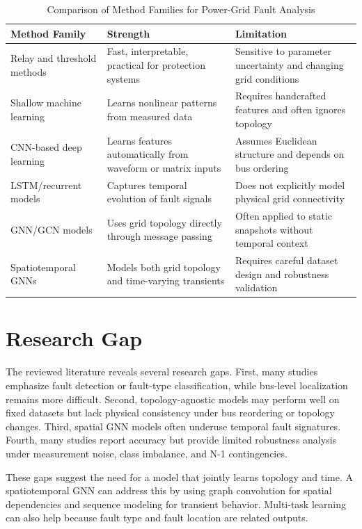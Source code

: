 \documentclass[12pt,a4paper]{article}
\begin{document}
\begin{table}[h]
\centering
\small
\caption{Comparison of Method Families for Power-Grid Fault Analysis}
\label{tab:comparison}
\begin{tabular}{@{}p{}p{}p{}@{}}
\toprule
\textbf{Method Family} & \textbf{Strength} & \textbf{Limitation} \\
\midrule
Relay and threshold methods & Fast, interpretable, practical for protection systems & Sensitive to parameter uncertainty and changing grid conditions \\
Shallow machine learning & Learns nonlinear patterns from measured data & Requires handcrafted features and often ignores topology \\
CNN-based deep learning & Learns features automatically from waveform or matrix inputs & Assumes Euclidean structure and depends on bus ordering \\
LSTM/recurrent models & Captures temporal evolution of fault signals & Does not explicitly model physical grid connectivity \\
GNN/GCN models & Uses grid topology directly through message passing & Often applied to static snapshots without temporal context \\
Spatiotemporal GNNs & Models both grid topology and time-varying transients & Requires careful dataset design and robustness validation \\
\bottomrule
\end{tabular}
\end{table}

\section{Research Gap}

The reviewed literature reveals several research gaps. First, many studies emphasize fault detection or fault-type classification, while bus-level localization remains more difficult. Second, topology-agnostic models may perform well on fixed datasets but lack physical consistency under bus reordering or topology changes. Third, spatial GNN models often underuse temporal fault signatures. Fourth, many studies report accuracy but provide limited robustness analysis under measurement noise, class imbalance, and N-1 contingencies.

These gaps suggest the need for a model that jointly learns topology and time. A spatiotemporal GNN can address this by using graph convolution for spatial dependencies and sequence modeling for transient behavior. Multi-task learning can also help because fault type and fault location are related outputs.
\end{document}
